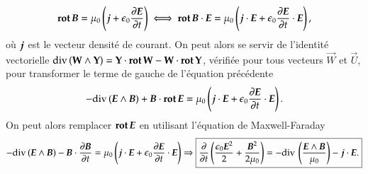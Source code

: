 \begin{equation*}
	\rot \vecb = \mu_0\left(\vecj + \epsilon_0 \dd{\vece}{t} \right)
	\iff 
	\rot \vecb \cdot \vece = \mu_0\left(\vecj \cdot \vece + 
	\epsilon_0 \dd{\vece}{t} \cdot \vece \right),
\end{equation*}
où $\vecj$ est le vecteur densité de courant.
On peut alors se servir de l'identité vectorielle $\mathrm{div}\,(\mathbf{W} \wedge
\mathbf{Y}) = \mathbf{Y} \cdot \mathrm{\textbf{rot}}\, \mathbf{W} - \mathbf{W} \cdot \mathrm{\textbf{rot}}\, \mathbf{Y}$, vérifiée
pour tous vecteurs $\vec{W}$ et $\vec{U}$, pour transformer le terme de 
gauche de l'équation précédente
\begin{equation*}
	- \div (\vece \wedge \vecb) + \vecb \cdot \rot \vece =
	\mu_0\left(\vecj \cdot \vece + \epsilon_0 \dd{\vece}{t} \cdot \vece \right).
\end{equation*}
On peut alors remplacer $\rot \vece$ en utilisant l'équation de Maxwell-Faraday
\begin{equation*}
	- \div (\vece \wedge \vecb) - \vecb \cdot \dd{\vecb}{t} =
	\mu_0\left(\vecj \cdot \vece + \epsilon_0 \dd{\vece}{t} \cdot \vece \right)
	\Rightarrow
	\boxed{\dfrac{\partial}{\partial t} \left(\dfrac{\epsilon_0 \vece^2}{2}
		+ \dfrac{\vecb^2}{2 \mu_0} \right) = - \div\left(
\dfrac{\vece \wedge \vecb}{\mu_0}\right) - \vecj \cdot \vece.}
\end{equation*}

